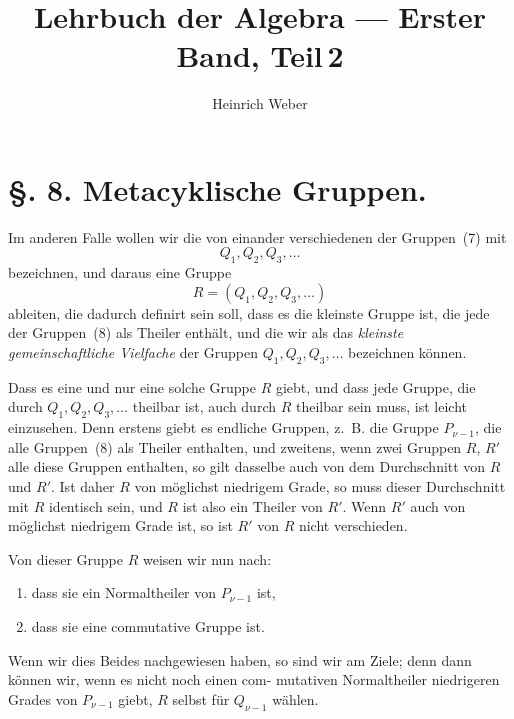 \documentclass[12pt,a4paper]{article}
\title{Lehrbuch der Algebra --- Erster Band, Teil\,2}
\author{Heinrich Weber}
\date{}
\theoremstyle{plain}
\theoremstyle{definition}
\theoremstyle{remark}
\begin{document}
\maketitle

\section*{\S. 8. Metacyklische Gruppen.}

Im anderen Falle wollen wir die von einander verschiedenen
der Gruppen~(7) mit
\begin{equation}\tag{8}
Q_1, Q_2, Q_3, \ldots
\end{equation}
bezeichnen, und daraus eine Gruppe
\begin{equation}\tag{9}
R = (Q_1, Q_2, Q_3, \ldots)
\end{equation}
ableiten, die dadurch definirt sein soll, dass es die kleinste
Gruppe ist, die jede der Gruppen~(8) als Theiler enthält, und
die wir als das \emph{kleinste gemeinschaftliche Vielfache} der
Gruppen $Q_1, Q_2, Q_3, \ldots$ bezeichnen können.

Dass es eine und nur eine solche Gruppe $R$ giebt, und dass
jede Gruppe, die durch $Q_1, Q_2, Q_3, \ldots$ theilbar ist, auch durch
$R$ theilbar sein muss, ist leicht einzusehen. Denn erstens giebt
es endliche Gruppen, z.~B. die Gruppe $P_{\nu-1}$, die alle Gruppen~(8)
als Theiler enthalten, und zweitens, wenn zwei Gruppen $R$, $R'$
alle diese Gruppen enthalten, so gilt dasselbe auch von dem
Durchschnitt von $R$ und $R'$. Ist daher $R$ von möglichst niedrigem
Grade, so muss dieser Durchschnitt mit $R$ identisch sein, und $R$
ist also ein Theiler von $R'$. Wenn $R'$ auch von möglichst
niedrigem Grade ist, so ist $R'$ von $R$ nicht verschieden.

Von dieser Gruppe $R$ weisen wir nun nach:
\begin{enumerate}[label=\alph*)]
\item dass sie ein Normaltheiler von $P_{\nu-1}$ ist,
\item dass sie eine commutative Gruppe ist.
\end{enumerate}

Wenn wir dies Beides nachgewiesen haben, so sind wir am
Ziele; denn dann können wir, wenn es nicht noch einen com-
mutativen Normaltheiler niedrigeren Grades von $P_{\nu-1}$ giebt,
$R$ selbst für $Q_{\nu-1}$ wählen.
\end{document}
